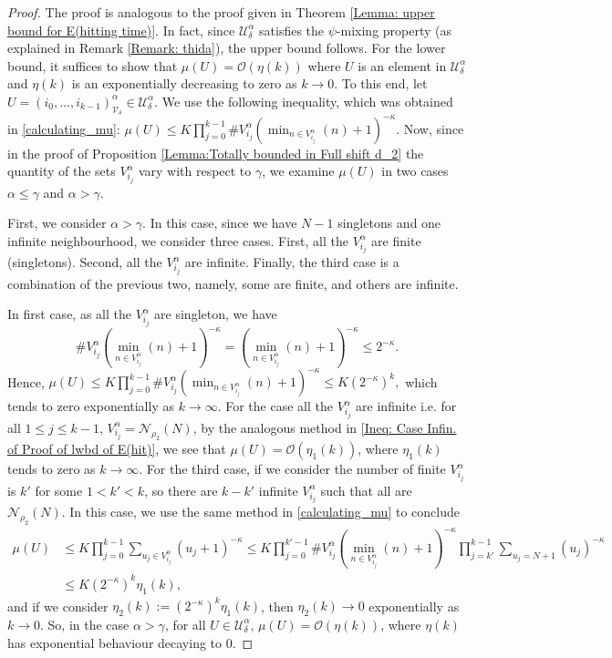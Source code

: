 \documentclass[11pt, reqno]{amsart}
\theoremstyle{plain}%
\theoremstyle{definition}
\theoremstyle{definition}
\numberwithin{equation}{section}
\begin{document}
\begin{proof}
The proof is analogous to the proof given in Theorem \ref{Lemma: upper bound for E(hitting time)}. In fact, since $\mathcal{U}_\delta^{\alpha}$ satisfies the $\psi$-mixing property (as explained in Remark \ref{Remark: thida}), the upper bound follows. For the lower bound, it suffices to show that $\mu(U)= \mathcal{O}(\eta(k))$ where $U$ is an element in $\mathcal{U}_\delta^{\alpha}$ and $\eta(k)$ is an exponentially decreasing to zero as $k\to 0$. To this end, let $U=(i_0,\ldots,i_{k-1})_{\mathcal{V}_\delta}^{\alpha}\in \mathcal{U}_\delta^{\alpha}$. We use the following inequality, which was obtained in \eqref{calculating_mu}:
$\mu(U)\le K \prod_{j=0}^{k-1} \#V_{i_j}^\alpha (\min_{n\in V_{i_j}^\alpha} (n)+1)^{-\kappa}.$ Now, since in the proof of Proposition \ref{Lemma:Totally bounded in Full shift d_2} the quantity of the sets $V_{i_j}^\alpha$ vary with respect to $\gamma$, we examine $\mu(U)$ in two cases $\alpha\le\gamma$ and $\alpha>\gamma$.

First, we consider $\alpha>\gamma$. In this case, since we have $N-1$ singletons and one infinite neighbourhood, we consider three cases. First, all the $V_{i_j}^\alpha$ are finite (singletons). Second, all the $V_{i_j}^\alpha$ are infinite. Finally, the third case is a combination of the previous two, namely, some are finite, and others are infinite.

 In first case, as all the $V_{i_j}^\alpha$ are singleton, we have 
$$ \#V_{i_j}^\alpha (\min_{n\in V_{i_j}^\alpha} (n)+1)^{-\kappa}=(\min_{n\in V_{i_j}^\alpha} (n)+1)^{-\kappa}\le 2^{-\kappa}.$$
Hence, 
$\mu(U)\le K \prod_{j=0}^{k-1} \#V_{i_j}^\alpha (\min_{n\in V_{i_j}^\alpha} (n)+1)^{-\kappa}\le K (2^{-\kappa})^k,$
 which tends to zero exponentially as $k\to \infty$. 
 For the case all the $V_{i_j}^\alpha$ are infinite i.e. for all $1\le j\le k-1$, $V_{i_j}^\alpha=\mathcal{N}_{\rho_2}(N)$, by the analogous method in \eqref{Ineq: Case Infin. of Proof of lwbd of E(hit)}, we see that $\mu(U)=\mathcal{O}(\eta_1(k))$, where $\eta_1(k)$ tends to zero as $k\to\infty$.
 For the third case, if we consider the number of finite $V_{i_j}^\alpha$ is $k'$ for some $1<k'<k$, so there are $k-k'$ infinite $V_{i_j}^\alpha$ such that all are $\mathcal{N}_{\rho_2}(N)$. In this case, we use the same method in \eqref{calculating_mu} to conclude
 \begin{align*}
    \mu(U)&\le K \prod_{j=0}^{k-1} \sum_{u_j\in V_{i_j}^\alpha} (u_j+1)^{-\kappa}\le K \prod_{j=0}^{k'-1} \#V_{i_j}^\alpha (\min_{n\in V_{i_j}^\alpha} (n)+1)^{-\kappa} \prod_{j=k'}^{k-1}\sum_{u_j= N+1} (u_j)^{-\kappa}\\& \le K (2^{-\kappa})^k \eta_1(k),
\end{align*}
 and if we consider $\eta_2(k):=(2^{-\kappa})^k \eta_1(k)$, then $\eta_2(k)\to 0$ exponentially as $k\to 0$. So, in the case $\alpha>\gamma$, for all $U\in \mathcal{U}_\delta^{\alpha}$, $\mu(U)=\mathcal{O}(\eta(k))$, where $\eta(k)$ has exponential behaviour decaying to 0. 


\end{proof}
\end{document}
